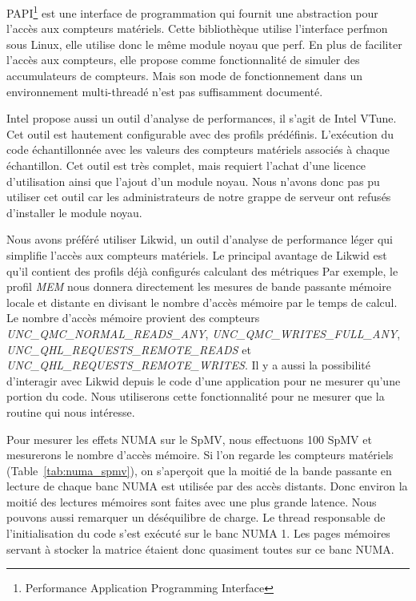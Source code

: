 PAPI\footnote{Performance Application Programming Interface} est une interface de programmation qui fournit une abstraction pour l'accès aux compteurs matériels.
%
Cette bibliothèque utilise l'interface perfmon sous Linux, elle utilise donc le même module noyau que perf.
%
En plus de faciliter l'accès aux compteurs, elle propose comme fonctionnalité de simuler des accumulateurs de compteurs.
%
Mais son mode de fonctionnement dans un environnement multi-threadé n'est pas suffisamment documenté.



Intel propose aussi un outil d'analyse de performances, il s'agit de Intel VTune.
%
Cet outil est hautement configurable avec des profils prédéfinis.
%
L'exécution du code échantillonnée avec les valeurs des compteurs matériels associés à chaque échantillon.
%
Cet outil est très complet, mais requiert l'achat d'une licence d'utilisation ainsi que l'ajout d'un module noyau.
%
Nous n'avons donc pas pu utiliser cet outil car les administrateurs de notre grappe de serveur ont refusés d'installer le module noyau.



Nous avons préféré utiliser Likwid, un outil d'analyse de performance léger qui simplifie l'accès aux compteurs matériels.
%
Le principal avantage de Likwid est qu'il contient des profils déjà configurés calculant des métriques 
%
Par exemple, le profil {\em MEM} nous donnera directement les mesures de bande passante mémoire locale et distante en divisant le nombre d'accès mémoire par le temps de calcul.
%
Le nombre d'accès mémoire provient des compteurs {\em UNC\_QMC\_NORMAL\_READS\_ANY}, {\em UNC\_QMC\_WRITES\_FULL\_ANY}, {\em UNC\_QHL\_REQUESTS\_REMOTE\_READS} et {\em UNC\_QHL\_REQUESTS\_REMOTE\_WRITES}.
%
Il y a aussi la possibilité d'interagir avec Likwid depuis le code d'une application pour ne mesurer qu'une portion du code.
%
Nous utiliserons cette fonctionnalité pour ne mesurer que la routine qui nous intéresse.



Pour mesurer les effets NUMA sur le SpMV, nous effectuons 100 SpMV et mesurerons le nombre d'accès mémoire.
%
Si l'on regarde les compteurs matériels (Table~\ref{tab:numa_spmv}), on s'aperçoit que la moitié de la bande passante en lecture de chaque banc NUMA est utilisée par des accès distants.
%
Donc environ la moitié des lectures mémoires sont faites avec une plus grande latence.
%
Nous pouvons aussi remarquer un déséquilibre de charge.
%
Le thread responsable de l'initialisation du code s'est exécuté sur le banc NUMA 1.
%
Les pages mémoires servant à stocker la matrice étaient donc quasiment toutes sur ce banc NUMA.

